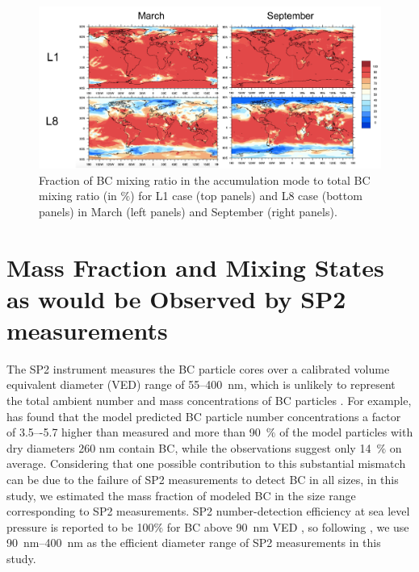 \documentclass[12pt, fullpage]{uiucthesis2009}
\begin{document}
	\begin{figure}[h] 
		\begin{center}
			\includegraphics[width = 1\textwidth]{Figure19}
			\caption[Fraction of BC mixing ratio in the accumulation mode to total BC mixing ratio (in $\%$) for L1 case (top panels) and L8 case (bottom panels) in March (left panels) and September (right panels)]{\label{fig_P19} Fraction of BC mixing ratio in the accumulation mode to total BC mixing ratio (in $\%$) for L1 case (top panels) and L8 case (bottom panels) in March (left panels) and September (right panels).}
		\end{center}
	\end{figure}
	
	\section{Mass Fraction and Mixing States as would be Observed by SP2 measurements}
	The SP2 instrument measures the BC particle cores over a calibrated volume equivalent diameter (VED) range of 55--400~nm, which is unlikely to represent the total
	ambient number and mass concentrations of BC particles \citep{Reddington2013}. For example, \citet{Reddington2013} has found that the model predicted BC particle number concentrations a factor of 3.5–-5.7 higher than measured and more than 90~$\%$ of the model particles with dry diameters 260 nm contain BC, while the observations suggest only 14~$\%$ on average. Considering that one possible contribution to this substantial mismatch can be due to the failure of SP2 measurements to detect BC in all sizes, in this study, we estimated the mass fraction of modeled BC in the size range corresponding to SP2 measurements. SP2 number-detection efficiency at sea level pressure is reported to be 100$\%$ for BC above 90~nm VED \citep{schwarz2010global}, so following \citet{Reddington2013}, we use 90~nm--400~nm as the efficient diameter range of SP2 measurements in this study.
	
\end{document}
